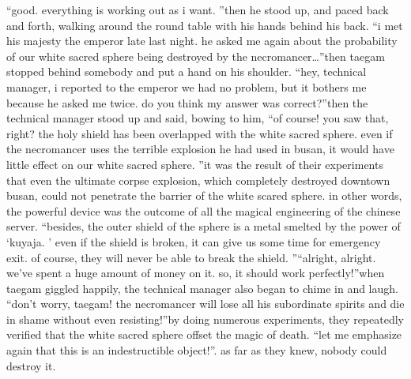 “good.
 everything is working out as i want.
”then he stood up, and paced back and forth, walking around the round table with his hands behind his back.
“i met his majesty the emperor late last night.
 he asked me again about the probability of our white sacred sphere being destroyed by the necromancer…”then taegam stopped behind somebody and put a hand on his shoulder.
“hey, technical manager, i reported to the emperor we had no problem, but it bothers me because he asked me twice.
 do you think my answer was correct?”then the technical manager stood up and said, bowing to him, “of course! you saw that, right? the holy shield has been overlapped with the white sacred sphere.
 even if the necromancer uses the terrible explosion he had used in busan, it would have little effect on our white sacred sphere.
”it was the result of their experiments that even the ultimate corpse explosion, which completely destroyed downtown busan, could not penetrate the barrier of the white scared sphere.
in other words, the powerful device was the outcome of all the magical engineering of the chinese server.
“besides, the outer shield of the sphere is a metal smelted by the power of ‘kuyaja.
’ even if the shield is broken, it can give us some time for emergency exit.
 of course, they will never be able to break the shield.
”“alright, alright.
 we’ve spent a huge amount of money on it.
 so, it should work perfectly!”when taegam giggled happily, the technical manager also began to chime in and laugh.
“don’t worry, taegam! the necromancer will lose all his subordinate spirits and die in shame without even resisting!”by doing numerous experiments, they repeatedly verified that the white sacred sphere offset the magic of death.
“let me emphasize again that this is an indestructible object!”.
as far as they knew, nobody could destroy it.


 